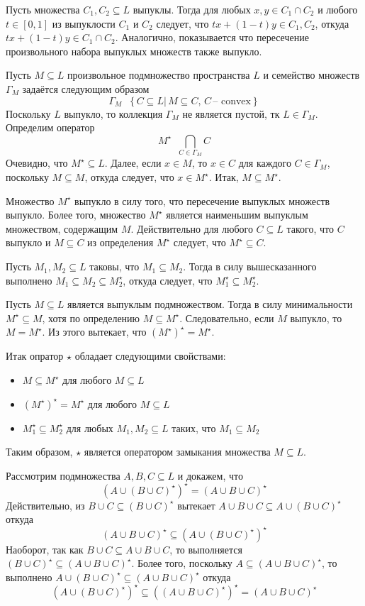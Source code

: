 \documentclass[a4paper]{article}
\newcommand{\obj}[1]{\left\{ #1 \right \}}
\newcommand{\clo}[1]{\left [ #1 \right ]}
\newcommand{\brac}[1]{\left ( #1 \right )}
\newcommand{\induc}[1]{\left . #1 \right \vert}
\newcommand{\defn}{\mathop{\overset{\Delta}{=}}\nolimits}
\begin{document}
Пусть множества $C_1, C_2\subseteq L$ выпуклы. Тогда для любых $x,y\in C_1\cap C_2$ и любого $t\in \clo{0,1}$ из выпуклости $C_1$ и $C_2$ следует, что $t x + (1-t) y\in C_1, C_2$, откуда $t x + (1-t) y\in C_1\cap C_2$. Аналогично, показывается что пересечение произвольного набора выпуклых множеств также выпукло.

Пусть $M\subseteq L$ произвольное подмножество пространства $L$ и семейство множеств $\Gamma_M$ задаётся следующим образом\[\Gamma_M \defn \obj{\induc{C\subseteq L}\,M\subseteq C,\,C\,\text{-- convex}}\] Поскольку $L$ выпукло, то коллекция $\Gamma_M$ не является пустой, тк $L\in \Gamma_M$. Определим оператор \[M^\star\defn \bigcap_{C\in \Gamma_M} C\] Очевидно, что $M^\star\subseteq L$. Далее, если $x\in M$, то $x\in C$ для каждого $C\in \Gamma_M$, поскольку $M\subseteq M$, откуда следует, что $x\in M^\star$. Итак, $M\subseteq M^\star$.

Множество $M^\star$ выпукло в силу того, что пересечение выпуклых множеств выпукло. Более того, множество $M^\star$ является наименьшим выпуклым множеством, содержащим $M$. Действительно для любого $C\subseteq L$ такого, что $C$ выпукло и $M\subseteq C$ из определения $M^\star$ следует, что $M^\star\subseteq C$.

Пусть $M_1, M_2\subseteq L$ таковы, что $M_1\subseteq M_2$. Тогда в силу вышесказанного выполнено $M_1\subseteq M_2\subseteq M_2^\star$, откуда следует, что $M_1^\star \subseteq M_2^\star$.

Пусть $M\subseteq L$ является выпуклым подмножеством. Тогда в силу минимальности $M^\star\subseteq M$, хотя по определению $M\subseteq M^\star$. Следовательно, если $M$ выпукло, то $M = M^\star$. Из этого вытекает, что $\brac{M^\star}^\star = M^\star$.

Итак опратор $\star$ обладает следующими свойствами: \begin{itemize}
	\item $M\subseteq M^\star$ для любого $M\subseteq L$
	\item $\brac{M^\star}^\star=M^\star$ для любого $M\subseteq L$
	\item $M_1^\star \subseteq M_2^\star$ для любых $M_1, M_2\subseteq L$ таких, что $M_1\subseteq M_2$
\end{itemize} Таким образом, $\star$ является оператором замыкания множества $M\subseteq L$. 

Рассмотрим подмножества $A,B,C\subseteq L$ и докажем, что \[\brac{A\cup \brac{B\cup C}^\star}^\star = \brac{A\cup B\cup C}^\star\] Действительно, из $B\cup C\subseteq \brac{B\cup C}^\star$ вытекает $A\cup B\cup C\subseteq A\cup \brac{B\cup C}^\star$ откуда \[\brac{A\cup B\cup C}^\star\subseteq \brac{A\cup \brac{B\cup C}^\star}^\star\] Наоборот, так как $B\cup C\subseteq A\cup B\cup C$, то выполняется $\brac{B\cup C}^\star \subseteq \brac{A\cup B\cup C}^\star$. Более того, поскольку $A\subseteq \brac{A\cup B\cup C}^\star$, то выполнено $A\cup \brac{B\cup C}^\star \subseteq \brac{A\cup B\cup C}^\star$ откуда \[\brac{A\cup \brac{B\cup C}^\star}^\star \subseteq \brac{\brac{A\cup B\cup C}^\star}^\star = \brac{A\cup B\cup C}^\star\]
\end{document}
